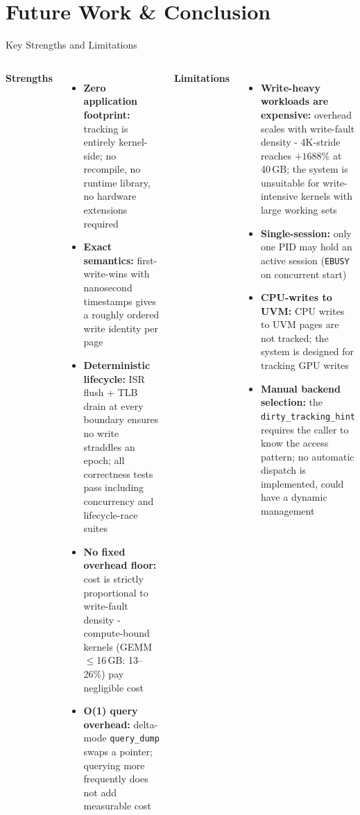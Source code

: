\section{Future Work \& Conclusion}

\begin{frame}{Key Strengths and Limitations}
\begin{columns}[T]

\textbf{Strengths}
\begin{itemize}[<+->]
    \scriptsize
    \item \textbf{Zero application footprint:} tracking is entirely kernel-side; no recompile, no runtime library, no hardware extensions required
    \item \textbf{Exact semantics:} first-write-wins with nanosecond timestamps gives a roughly ordered write identity per page
    \item \textbf{Deterministic lifecycle:} ISR flush + TLB drain at every boundary ensures no write straddles an epoch; all correctness tests pass including concurrency and lifecycle-race suites
    \item \textbf{No fixed overhead floor:} cost is strictly proportional to write-fault density - compute-bound kernels (GEMM $\leq$16\,GB: 13--26\%) pay negligible cost
    \item \textbf{O(1) query overhead:} delta-mode \texttt{query\_dump} swaps a pointer; querying more frequently does not add measurable cost
\end{itemize}


\textbf{Limitations}
\begin{itemize}[<+->]
    \scriptsize
    \item \textbf{Write-heavy workloads are expensive:} overhead scales with write-fault density - 4K-stride reaches $+1688\%$ at 40\,GB; the system is unsuitable for write-intensive kernels with large working sets
    \item \textbf{Single-session:} only one PID may hold an active session (\texttt{EBUSY} on concurrent start)
    \item \textbf{CPU-writes to UVM:} CPU writes to UVM pages are not tracked; the system is designed for tracking GPU writes
    \item \textbf{Manual backend selection:} the \texttt{dirty\_tracking\_hint} requires the caller to know the access pattern; no automatic dispatch is implemented, could have a dynamic management
\end{itemize}

\end{columns}
\end{frame}

